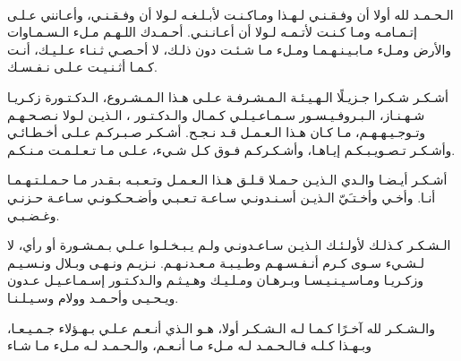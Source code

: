 \ \vfill{}
\begin{center}
    {
        \Large\bfseries
    }
\end{center}

\begin{RLtext}
    الـحـمـد لله أولا أن وفـقـنـي لـهـذا ومـاكـنـت لأبـلـغـه لـولا أن وفـقـنـي،
    وأعـانني عـلـى إتـمـامـه ومـا كـنـت لأتـمـه لـولا أن أعـانـنـي.
    أحـمـدك اللـهـم مـلء الـسـمـاوات والأرض ومـلء مـابـيـنـهـمـا ومـلء مـا شـئـت دون ذلـك،
    لا أحـصـي ثـنـاء عـلـيـك، أنـت كـمـا أثـنـيـت عـلـى نـفـسـك.
    
    أشـكـر شـكـرا جـزيـلًا الـهـيـئـة الـمـشـرفـة عـلـى هـذا الـمـشـروع،
    الـدكـتـورة زكـريـا شـهـنـاز، الـبـروفـيـسـور سـمـاعـيـلـي كـمـال والـدكـتـور ،
    الـذيـن لـولا نـصـحـهـم وتـوجـيـهـهـم، مـا كـان هـذا الـعـمـل قـد نـجـح.
    أشـكـر صـبـركـم عـلـى أخـطـائـي وأشـكـر تـصـويـبـكـم إيـاهـا،
    وأشـكـركـم فـوق كـل شـيء، عـلـى مـا تـعـلـمـت مـنـكـم.
    
    أشـكـر أيـضـا والـدي الـذيـن حـمـلا قـلـق هـذا الـعـمـل وتـعـبـه بـقـدر مـا حـمـلـتـهـمـا أنـا.
    وأخـي وأخـتـَيّ الـذيـن أسـنـدونـي سـاعـة تـعـبـي وأضـحـكـونـي سـاعـة حـزنـي وغـضـبـي.
    
    الـشـكـر كـذلـك لأولـئـك الـذيـن سـاعـدونـي ولـم يـبـخـلـوا عـلـي بـمـشـورة أو رأي، 
    لا لـشـيء سـوى كـرم أنـفـسـهـم وطـيـبـة مـعـدنـهـم.
    نـزيـم ونـهـى وبـلال ونـسـيـم وزكـريـا ومـاسـيـنـيـسـا وبـرهـان ومـلـيـك وهـيـثـم والـدكـتـور إسـمـاعـيـل عـدون
    ويـحـيـى وأحـمـد وولام وسـيـلـنـا.
    
    والـشـكـر لله آخـرًا كـمـا لـه الـشـكـر أولا، 
    هـو الـذي أنـعـم عـلـي بـهـؤلاء جـمـيـعـا، وبـهـذا كـلـه
    فـالـحـمـد لـه مـلء مـا أنـعـم، والـحـمـد لـه مـلء مـا شـاء
\end{RLtext}
\vfill{}